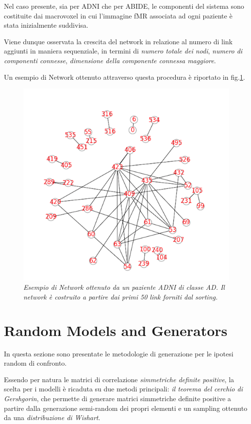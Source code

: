 \documentclass[12pt,openright,a4paper]{article}
\begin{document}
Nel caso presente, sia per ADNI che per ABIDE, le componenti del sistema sono costituite dai macrovoxel in cui l'immagine fMR associata ad ogni paziente è stata inizialmente suddivisa.

Viene dunque osservata la crescita del network in relazione al numero di link aggiunti in maniera sequenziale, in termini di \textit{numero totale dei nodi}, \textit{numero di componenti connesse}, \textit{dimensione della componente connessa maggiore}.

Un esempio di Network ottenuto attraverso questa procedura è riportato in fig.\ref{ADNI50}.

\begin{figure}[!h]
\centering
\includegraphics[scale=0.4]{ADNI50c}
\caption{\textit{Esempio di Network ottenuto da un paziente ADNI di classe AD. Il network è costruito a partire dai primi 50 link forniti dal sorting.}}
\label{ADNI50}
\end{figure}

\section{Random Models and Generators}

In questa sezione sono presentate le metodologie di generazione per le ipotesi random di confronto.

Essendo per natura le matrici di correlazione \textit{simmetriche definite positive}, la scelta per i modelli è ricaduta su due metodi principali: \textit{il teorema del cerchio di Gershgorin}, che permette di generare matrici simmetriche definite positive a partire dalla generazione semi-random dei propri elementi e un sampling ottenuto da una \textit{distribuzione di Wishart}. 
\end{document}
